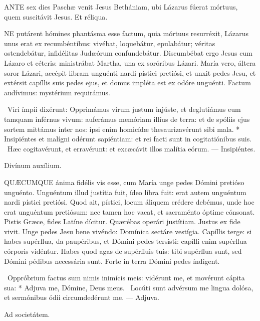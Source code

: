 \lettrine[lines=2]{A}{NTE} sex dies Paschæ venit Jesus Bethániam, ubi Lázarus fúerat mórtuus, quem suscitávit Jesus. Et réliqua.



\lettrine[lines=2]{N}{E} putárent hómines phantásma esse factum, quia mórtuus resurréxit, Lázarus unus erat ex recumbéntibus: vivébat, loquebátur, epulabátur; véritas ostendebátur, infidélitas Judæórum confundebátur. Discumbébat ergo Jesus cum Lázaro et céteris: ministrábat Martha, una ex soróribus Lázari. María vero, áltera soror Lázari, accépit libram unguénti nardi pístici pretiósi, et unxit pedes Jesu, et extérsit capíllis suis pedes ejus, et domus impléta est ex odóre unguénti. Factum audívimus: mystérium requirámus.

\R\ Viri ímpii dixérunt: Opprimámus virum justum injúste, et deglutiámus eum tamquam inférnus vivum: auferámus memóriam illíus de terra: et de spóliis ejus sortem mittámus inter nos: ipsi enim homicídæ thesaurizavérunt sibi mala. * Insipiéntes et malígni odérunt sapiéntiam: et rei facti sunt in cogitatiónibus suis. \V\ Hæc cogitavérunt, et erravérunt: et excæcávit illos malítia eórum. --- Insipiéntes.

 Divínum auxílium.


\lettrine[lines=2]{Q}{UÆCUMQUE} ánima fidélis vis esse, cum María unge pedes Dómini pretióso unguénto. Unguéntum illud justítia fuit, ídeo libra fuit: erat autem unguéntum nardi pístici pretiósi. Quod ait, pístici, locum áliquem crédere debémus, unde hoc erat unguéntum pretiósum: nec tamen hoc vacat, et sacraménto óptime cónsonat. Pistis Græce, fides Latíne dícitur. Quærébas operári justítiam. Justus ex fide vivit. Unge pedes Jesu bene vivéndo: Domínica sectáre vestígia. Capíllis terge: si habes supérflua, da paupéribus, et Dómini pedes tersísti: capílli enim supérflua córporis vidéntur. Habes quod agas de supérfluis tuis: tibi supérflua sunt, sed Dómini pédibus necessária sunt. Forte in terra Dómini pedes índigent.

\R\ Oppróbrium factus sum nimis inimícis meis: vidérunt me, et movérunt cápita sua: * Adjuva me, Dómine, Deus meus. \V\ Locúti sunt advérsum me lingua dolósa, et sermónibus ódii circumdedérunt me. --- Adjuva.

 Ad societátem.

